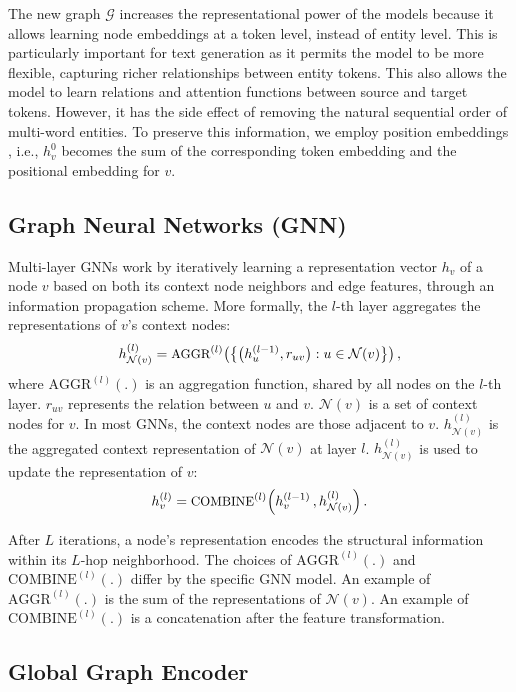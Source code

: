 \documentclass[11pt,a4paper]{article}
\begin{document}
The new graph $\mathcal{G}$ increases the representational power of the models because it allows learning node embeddings at a token level, instead of entity level. This is particularly important for text generation as it permits the model to be more flexible, capturing richer relationships between entity tokens. This also allows the model to learn relations and attention functions between source and target tokens. However, it has the side effect of removing the natural sequential order of multi-word entities. To preserve this information, we employ position embeddings \cite{NIPS2017_7181}, i.e., $h^{0}_v$ becomes the sum of the corresponding token embedding and the positional embedding for $v$.

\subsection{Graph Neural Networks (GNN)}
Multi-layer GNNs work by iteratively learning a representation vector $h_v$ of a node $v$ based on both its context node neighbors and edge features, through an information propagation scheme. More formally, the $l$-th layer aggregates the representations of $v$'s context nodes:
$$
        h_{\mathcal{N}(v)}^{(l)} = \textrm{\small AGGR}^{(l)} \big( \big\{ \big( h_u^{(l-1)}, r_{uv} \big) : u \in \mathcal{N}(v)  \big\} \big)  \, ,
$$
where $\textrm{AGGR}^{(l)}(.)$ is an aggregation function, shared by all nodes on the $l$-th layer. $r_{uv}$ represents the relation between $u$ and $v$. $\mathcal{N}(v)$ is a set of context nodes for $v$. In most GNNs, the context nodes are those adjacent to $v$. $h_{\mathcal{N}(v)}^{(l)}$ is the aggregated context representation of $\mathcal{N}(v)$ at layer $l$. $h_{\mathcal{N}(v)}^{(l)}$ is used to update the representation of $v$:
$$
       h_{v}^{(l)} = \textrm{\small COMBINE}^{(l)} \Big( h_v^{(l-1)} \, , h_{\mathcal{N}(v)}^{(l)}  \Big) \, .
$$

After $L$ iterations, a node's representation encodes the structural information within its $L$-hop neighborhood.
The choices of $\textrm{AGGR}^{(l)}(.)$ and $\textrm{COMBINE}^{(l)}(.)$ differ by the specific GNN model. An example of $\textrm{AGGR}^{(l)}(.)$ is the sum of the representations of $\mathcal{N}(v)$. An example of $\textrm{COMBINE}^{(l)}(.)$ is a concatenation after the feature transformation. 








\subsection{Global Graph Encoder} 
\label{sec:globalgraphenc}
\end{document}
